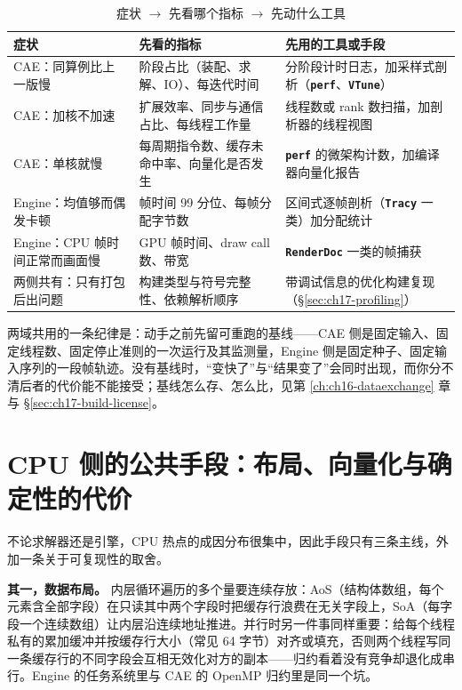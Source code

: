 \documentclass[12pt,a4paper,fontset=fandol]{ctexbook}
\newcommand{\Lib}[1]{\textbf{\texttt{#1}}}
\newcommand{\Lang}[1]{\textsf{#1}}
\newcommand{\DomCAE}{\Lang{CAE}}
\newcommand{\DomEngine}{\Lang{Engine}}
\begin{document}
\begin{table}[htbp]
\centering
\caption{症状 $\rightarrow$ 先看哪个指标 $\rightarrow$ 先动什么工具}
\label{tab:ch17-symptom}
\begin{tabular}{>{\raggedright\arraybackslash}p{}
                >{\raggedright\arraybackslash}p{}
                >{\raggedright\arraybackslash}p{}}
\toprule
\textbf{症状} & \textbf{先看的指标} & \textbf{先用的工具或手段} \\
\midrule
\DomCAE{}：同算例比上一版慢 & 阶段占比（装配、求解、IO）、每迭代时间 & 分阶段计时日志，加采样式剖析（\Lib{perf}、\Lib{VTune}） \\
\DomCAE{}：加核不加速 & 扩展效率、同步与通信占比、每线程工作量 & 线程数或 rank 数扫描，加剖析器的线程视图 \\
\DomCAE{}：单核就慢 & 每周期指令数、缓存未命中率、向量化是否发生 & \Lib{perf} 的微架构计数，加编译器向量化报告 \\
\DomEngine{}：均值够而偶发卡顿 & 帧时间 99 分位、每帧分配字节数 & 区间式逐帧剖析（\Lib{Tracy} 一类）加分配统计 \\
\DomEngine{}：CPU 帧时间正常而画面慢 & GPU 帧时间、draw call 数、带宽 & \Lib{RenderDoc} 一类的帧捕获 \\
两侧共有：只有打包后出问题 & 构建类型与符号完整性、依赖解析顺序 & 带调试信息的优化构建复现（\S\ref{sec:ch17-profiling}） \\
\bottomrule
\end{tabular}
\end{table}

两域共用的一条纪律是：动手之前先留可重跑的基线——\DomCAE{} 侧是固定输入、固定线程数、固定停止准则的一次运行及其监测量，\DomEngine{} 侧是固定种子、固定输入序列的一段帧轨迹。没有基线时，``变快了''与``结果变了''会同时出现，而你分不清后者的代价能不能接受；基线怎么存、怎么比，见第 \ref{ch:ch16-dataexchange} 章与 \S\ref{sec:ch17-build-license}。

\section{CPU 侧的公共手段：布局、向量化与确定性的代价}
\label{sec:ch17-cpu}

不论求解器还是引擎，CPU 热点的成因分布很集中，因此手段只有三条主线，外加一条关于可复现性的取舍。

\textbf{其一，数据布局。} 内层循环遍历的多个量要连续存放：AoS（结构体数组，每个元素含全部字段）在只读其中两个字段时把缓存行浪费在无关字段上，SoA（每字段一个连续数组）让内层沿连续地址推进。并行时另一件事同样重要：给每个线程私有的累加缓冲并按缓存行大小（常见 64 字节）对齐或填充，否则两个线程写同一条缓存行的不同字段会互相无效化对方的副本——归约看着没有竞争却退化成串行。\DomEngine{} 的任务系统里与 \DomCAE{} 的 \Lang{OpenMP} 归约里是同一个坑。
\end{document}
